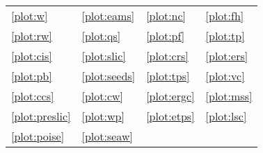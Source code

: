 	{\scriptsize
		\begin{tabularx}{0.475\textwidth}{X X X l}
			\ref{plot:w} \W &
			\ref{plot:eams} \EAMS &
			\ref{plot:nc} \NC &
			\ref{plot:fh} \FH\\
			\ref{plot:rw} \RW &
			\ref{plot:qs} \QS &
			\ref{plot:pf} \PF &
			\ref{plot:tp} \TP\\
			\ref{plot:cis} \CIS &
			\ref{plot:slic} \SLIC &
			\ref{plot:crs} \CRS &
			\ref{plot:ers} \ERS\\
			\ref{plot:pb} \PB &
			\ref{plot:seeds} \SEEDS &
			\ref{plot:tps} \TPS &
			\ref{plot:vc} \VC\\
			\ref{plot:ccs} \CCS &
			\ref{plot:cw} \CW &
			\ref{plot:ergc} \ERGC &
			\ref{plot:mss} \MSS\\
			\ref{plot:preslic} \preSLIC &
			\ref{plot:wp} \WP &
			\ref{plot:etps} \ETPS &
			\ref{plot:lsc} \LSC\\
			\ref{plot:poise} \POISE &
			\ref{plot:seaw} \SEAW &
		\end{tabularx}
	}

